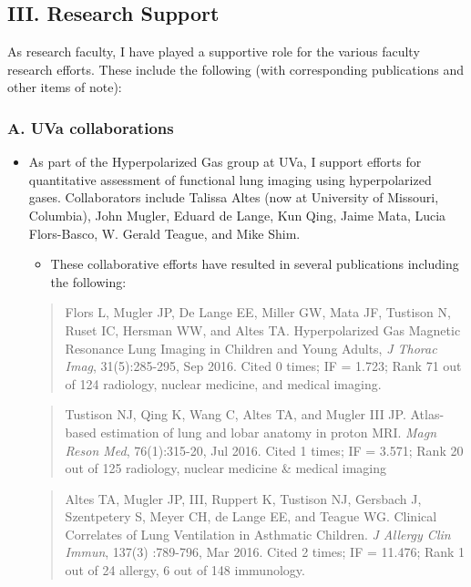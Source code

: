 \documentclass[11pt,]{article}
\providecommand{\tightlist}{%
  \setlength{\itemsep}{0pt}\setlength{\parskip}{0pt}}
\begin{document}
\subsection{III. Research Support}\label{iii.-research-support}

As research faculty, I have played a supportive role for the various
faculty research efforts. These include the following (with
corresponding publications and other items of note):

\subsubsection{A. UVa collaborations}\label{a.-uva-collaborations}

\begin{itemize}
\item
  As part of the Hyperpolarized Gas group at UVa, I support efforts for
  quantitative assessment of functional lung imaging using
  hyperpolarized gases. Collaborators include Talissa Altes (now at
  University of Missouri, Columbia), John Mugler, Eduard de Lange, Kun
  Qing, Jaime Mata, Lucia Flors-Basco, W. Gerald Teague, and Mike Shim.

  \begin{itemize}
  \tightlist
  \item
    These collaborative efforts have resulted in several publications
    including the following:
  \end{itemize}

  \begin{quote}
  Flors L, Mugler JP, De Lange EE, Miller GW, Mata JF, Tustison N, Ruset
  IC, Hersman WW, and Altes TA. Hyperpolarized Gas Magnetic Resonance
  Lung Imaging in Children and Young Adults, \emph{J Thorac Imag},
  31(5):285-295, Sep 2016. Cited 0 times; IF = 1.723; Rank 71 out of 124
  radiology, nuclear medicine, and medical imaging.
  \end{quote}

  \begin{quote}
  Tustison NJ, Qing K, Wang C, Altes TA, and Mugler III JP. Atlas-based
  estimation of lung and lobar anatomy in proton MRI. \emph{Magn Reson
  Med}, 76(1):315-20, Jul 2016. Cited 1 times; IF = 3.571; Rank 20 out
  of 125 radiology, nuclear medicine \& medical imaging
  \end{quote}

  \begin{quote}
  Altes TA, Mugler JP, III, Ruppert K, Tustison NJ, Gersbach J,
  Szentpetery S, Meyer CH, de Lange EE, and Teague WG. Clinical
  Correlates of Lung Ventilation in Asthmatic Children. \emph{J Allergy
  Clin Immun}, 137(3) :789-796, Mar 2016. Cited 2 times; IF = 11.476;
  Rank 1 out of 24 allergy, 6 out of 148 immunology.
  \end{quote}


\end{itemize}
\end{document}
